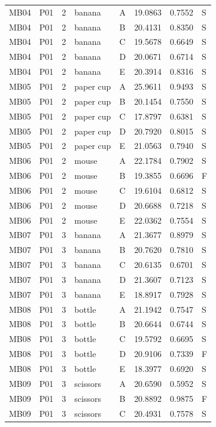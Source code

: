 \documentclass[11pt]{article}
\begin{document}
\begin{longtable}{lll llrrl}
MB04 & P01 & 2 & banana & A & 19.0863 & 0.7552 & S \\
MB04 & P01 & 2 & banana & B & 20.4131 & 0.8350 & S \\
MB04 & P01 & 2 & banana & C & 19.5678 & 0.6649 & S \\
MB04 & P01 & 2 & banana & D & 20.0671 & 0.6714 & S \\
MB04 & P01 & 2 & banana & E & 20.3914 & 0.8316 & S \\
MB05 & P01 & 2 & paper cup & A & 25.9611 & 0.9493 & S \\
MB05 & P01 & 2 & paper cup & B & 20.1454 & 0.7550 & S \\
MB05 & P01 & 2 & paper cup & C & 17.8797 & 0.6381 & S \\
MB05 & P01 & 2 & paper cup & D & 20.7920 & 0.8015 & S \\
MB05 & P01 & 2 & paper cup & E & 21.0563 & 0.7940 & S \\
MB06 & P01 & 2 & mouse & A & 22.1784 & 0.7902 & S \\
MB06 & P01 & 2 & mouse & B & 19.3855 & 0.6696 & F \\
MB06 & P01 & 2 & mouse & C & 19.6104 & 0.6812 & S \\
MB06 & P01 & 2 & mouse & D & 20.6688 & 0.7218 & S \\
MB06 & P01 & 2 & mouse & E & 22.0362 & 0.7554 & S \\
MB07 & P01 & 3 & banana & A & 21.3677 & 0.8979 & S \\
MB07 & P01 & 3 & banana & B & 20.7620 & 0.7810 & S \\
MB07 & P01 & 3 & banana & C & 20.6135 & 0.6701 & S \\
MB07 & P01 & 3 & banana & D & 21.3607 & 0.7123 & S \\
MB07 & P01 & 3 & banana & E & 18.8917 & 0.7928 & S \\
MB08 & P01 & 3 & bottle & A & 21.1942 & 0.7547 & S \\
MB08 & P01 & 3 & bottle & B & 20.6644 & 0.6744 & S \\
MB08 & P01 & 3 & bottle & C & 19.5792 & 0.6695 & S \\
MB08 & P01 & 3 & bottle & D & 20.9106 & 0.7339 & F \\
MB08 & P01 & 3 & bottle & E & 18.3977 & 0.6920 & S \\
MB09 & P01 & 3 & scissors & A & 20.6590 & 0.5952 & S \\
MB09 & P01 & 3 & scissors & B & 20.8892 & 0.9875 & F \\
MB09 & P01 & 3 & scissors & C & 20.4931 & 0.7578 & S \\

\end{longtable}
\end{document}

